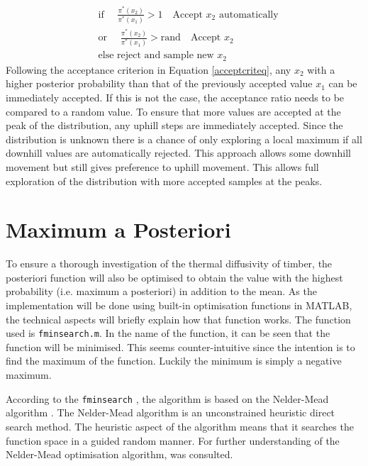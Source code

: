 		\begin{equation} \label{acceptcriteq}
		\begin{aligned}
		&\text{if  }\quad \frac{\pi^*  (x_2)}{\pi^* (x_1)} > 1 \quad \text{Accept } x_2 \text{ automatically}\\
		&\text{or  }\quad \frac{\pi^* (x_2)}{\pi^* (x_1)} > \text{rand}  \quad \text{Accept } x_2\\
		&\text{else reject and sample new } x_2
		\end{aligned}
		\end{equation}
Following the acceptance criterion in Equation \ref{acceptcriteq}, any $x_2$ with a higher posterior probability than that of the previously accepted value $x_1$ can be immediately accepted.
If this is not the case, the acceptance ratio needs to be compared to a random value.
To ensure that more values are accepted at the peak of the distribution, any uphill steps are immediately accepted.
Since the distribution is unknown there is a chance of only exploring a local maximum if all downhill values are automatically rejected.
This approach allows some downhill movement but still gives preference to uphill movement.
This allows full exploration of the distribution with more accepted samples at the peaks.

\section{Maximum a Posteriori}
To ensure a thorough investigation of the thermal diffusivity of timber, the posteriori function will also be optimised to obtain the value with the highest probability (i.e. maximum a posteriori) in addition to the mean.
As the implementation will be done using built-in optimisation functions in MATLAB, the technical aspects will briefly explain how that function works.
The function used is \texttt{fminsearch.m}.
In the name of the function, it can be seen that the function will be minimised.
This seems counter-intuitive since the intention is to find the maximum of the function. 
Luckily the minimum is simply a negative maximum. 

According to the \texttt{fminsearch} \citet{Matlab}, the algorithm is based on the Nelder-Mead algorithm \citep{Lagarias:1998}.
The Nelder-Mead algorithm is an unconstrained heuristic direct search method.
The heuristic aspect of the algorithm means that it searches the function space in a guided random manner.
For further understanding of the Nelder-Mead optimisation algorithm, \citet{sachin:2016} was consulted.


